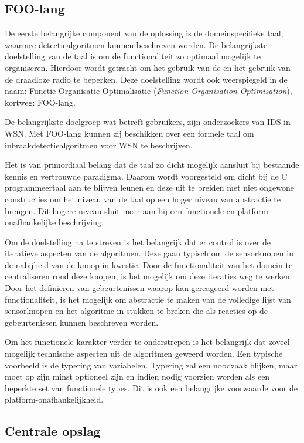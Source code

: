 \subsection{FOO-lang}
\label{subsection:arch-foo-lang}

De eerste belangrijke component van de oplossing is de domeinspecifieke taal,
waarmee detectiealgoritmen kunnen beschreven worden. De belangrijkste
doelstelling van de taal is om de functionaliteit zo optimaal mogelijk te
organiseren. Hierdoor wordt getracht om het gebruik van de \mcu en het gebruik
van de draadloze radio te beperken. Deze doelstelling wordt ook weerspiegeld in
de naam: Functie Organisatie Optimalisatie (\emph{Function Organisation
Optimisation}), kortweg: FOO-lang.

De belangrijkste doelgroep wat betreft gebruikers, zijn onderzoekers van IDS in
WSN. Met FOO-lang kunnen zij beschikken over een formele taal om
inbraakdetectiealgoritmen voor WSN te beschrijven.

Het is van primordiaal belang dat de taal zo dicht mogelijk aansluit bij
bestaande kennis en vertrouwde paradigma. Daarom wordt voorgesteld om dicht bij
de C programmeertaal aan te blijven leunen en deze uit te breiden met niet
ongewone constructies om het niveau van de taal op een hoger niveau van
abstractie te brengen. Dit hogere niveau sluit meer aan bij een functionele en
platform-onafhankelijke beschrijving.

Om de doelstelling na te streven is het belangrijk dat er control is over de
iteratieve aspecten van de algoritmen. Deze gaan typisch om de sensorknopen in
de nabijheid van de knoop in kwestie. Door de functionaliteit van het domein te
centraliseren rond deze knopen, is het mogelijk om deze iteraties weg te
werken. Door het defini\"eren van gebeurtenissen waarop kan gereageerd worden
met functionaliteit, is het mogelijk om abstractie te maken van de volledige
lijst van sensorknopen en het algoritme in stukken te breken die als reacties
op de gebeurtenissen kunnen beschreven worden.

Om het functionele karakter verder te onderstrepen is het belangrijk dat zoveel
mogelijk technische aspecten uit de algoritmen geweerd worden. Een typische
voorbeeld is de typering van variabelen. Typering zal een noodzaak blijken,
maar moet op zijn minst optioneel zijn en indien nodig voorzien worden als een
beperkte set van functionele types. Dit is ook een belangrijke voorwaarde voor
de platform-onafhankelijkheid.

\subsection{Centrale opslag}
\label{subsection:arch-repository}


